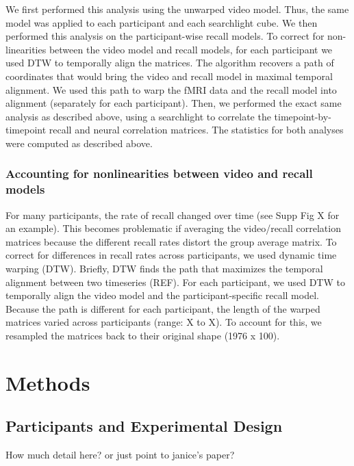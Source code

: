 We first performed this analysis using the unwarped video model. Thus, the same model was applied to each participant and each searchlight cube. We then performed this analysis on the participant-wise recall models. To correct for non-linearities between the video model and recall models, for each participant we used DTW to temporally align the matrices. The algorithm recovers a path of coordinates that would bring the video and recall model in maximal temporal alignment. We used this path to warp the fMRI data and the recall model into alignment (separately for each participant). Then, we performed the exact same analysis as described above, using a searchlight to correlate the timepoint-by-timepoint recall and neural correlation matrices. The statistics for both analyses were computed as described above.

\subsubsection{Accounting for nonlinearities between video and recall models}
For many participants, the rate of recall changed over time (see Supp Fig X for an example). This becomes problematic if averaging the video/recall correlation matrices because the different recall rates distort the group average matrix. To correct for differences in recall rates across participants, we used dynamic time warping (DTW).  Briefly, DTW finds the path that maximizes the temporal alignment between two timeseries (REF). For each participant, we used DTW to temporally align the video model and the participant-specific recall model. Because the path is different for each participant, the length of the warped matrices varied across participants (range: X to X). To account for this, we resampled the matrices back to their original shape (1976 x 100).


\section{Methods}
\label{sec:methods}

\subsection{Participants and Experimental Design}
How much detail here? or just point to janice's paper?

